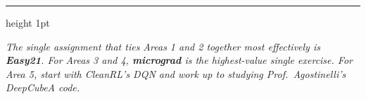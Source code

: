\documentclass[11pt,letterpaper]{article}
\begin{document}
\vspace{12pt}
\hrule height 1pt
\vspace{6pt}
\begin{center}
\textit{The single assignment that ties Areas 1 and 2 together most effectively is \textbf{Easy21}. For Areas 3 and 4, \textbf{micrograd} is the highest-value single exercise. For Area 5, start with CleanRL's DQN and work up to studying Prof.\ Agostinelli's DeepCubeA code.}
\end{center}
\end{document}
